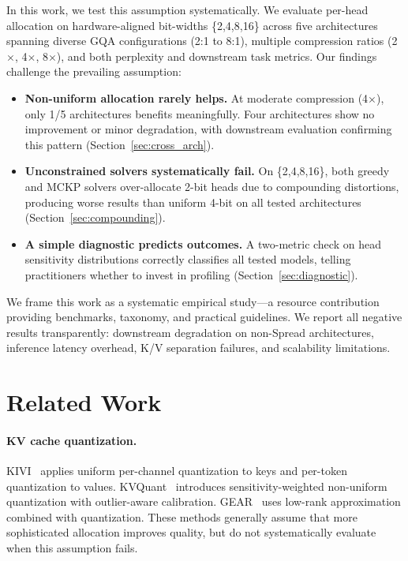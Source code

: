 \documentclass[11pt,a4paper]{article}
\begin{document}
In this work, we test this assumption systematically.
We evaluate per-head allocation on hardware-aligned bit-widths \{2,4,8,16\} across five architectures spanning diverse GQA configurations (2:1 to 8:1), multiple compression ratios (2$\times$, 4$\times$, 8$\times$), and both perplexity and downstream task metrics.
Our findings challenge the prevailing assumption:

\begin{itemize}[nosep,leftmargin=*]
\item \textbf{Non-uniform allocation rarely helps.} At moderate compression (4$\times$), only 1/5 architectures benefits meaningfully. Four architectures show no improvement or minor degradation, with downstream evaluation confirming this pattern (Section~\ref{sec:cross_arch}).
\item \textbf{Unconstrained solvers systematically fail.} On \{2,4,8,16\}, both greedy and MCKP solvers over-allocate 2-bit heads due to compounding distortions, producing worse results than uniform 4-bit on all tested architectures (Section~\ref{sec:compounding}).
\item \textbf{A simple diagnostic predicts outcomes.} A two-metric check on head sensitivity distributions correctly classifies all tested models, telling practitioners whether to invest in profiling (Section~\ref{sec:diagnostic}).
\end{itemize}

We frame this work as a systematic empirical study---a resource contribution providing benchmarks, taxonomy, and practical guidelines.
We report all negative results transparently: downstream degradation on non-Spread architectures, inference latency overhead, K/V separation failures, and scalability limitations.

\section{Related Work}

\paragraph{KV cache quantization.}
KIVI~\cite{liu2024kivi} applies uniform per-channel quantization to keys and per-token quantization to values.
KVQuant~\cite{hooper2024kvquant} introduces sensitivity-weighted non-uniform quantization with outlier-aware calibration.
GEAR~\cite{kang2024gear} uses low-rank approximation combined with quantization.
These methods generally assume that more sophisticated allocation improves quality, but do not systematically evaluate when this assumption fails.
\end{document}
